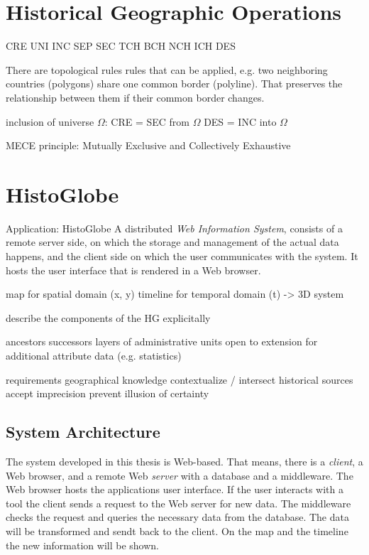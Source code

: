 \section{Historical Geographic Operations} %
\label{sec:historical_geographic_operations}

CRE
UNI
INC
SEP
SEC
TCH
BCH
NCH
ICH
DES


There are topological rules rules that can be applied, e.g. two neighboring countries (polygons) share one common border (polyline). That preserves the relationship between them if their common border changes.

inclusion of universe $\Omega$:
CRE = SEC from $\Omega$
DES = INC into $\Omega$

MECE principle: Mutually Exclusive and Collectively Exhaustive


\section{HistoGlobe} %
\label{sec:histoglobe}

Application: HistoGlobe
A distributed \emph{Web Information System}, consists of a remote server side, on which the storage and management of the actual data happens, and the client side on which the user communicates with the system. It hosts the user interface that is rendered in a Web browser.

map for spatial domain (x, y)
timeline for temporal domain (t)
-> 3D system

describe the components of the HG explicitally

ancestors successors
layers of administrative units
open to extension for additional attribute data (e.g. statistics)

requirements
  geographical knowledge
  contextualize / intersect historical sources
  accept imprecision
  prevent illusion of certainty

\subsection{System Architecture} %
\label{sub:system_architecture}

The system developed in this thesis is Web-based. That means, there is a \emph{client}, a Web browser, and a remote Web \emph{server} with a database and a middleware. The Web browser hosts the applications user interface. If the user interacts with a tool the client sends a request to the Web server for new data. The middleware checks the request and queries the necessary data from the database. The data will be transformed and sendt back to the client. On the map and the timeline the new information will be shown.

